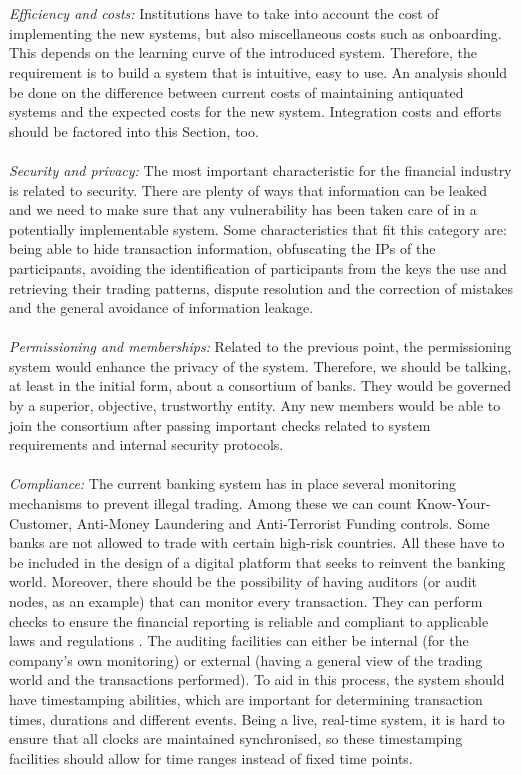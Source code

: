 \documentclass[12pt,twoside]{article}
\begin{document}
\\ \\
\textit{Efficiency and costs:} Institutions have to take into account the cost of implementing the new systems, but also miscellaneous costs such as onboarding. This depends on the learning curve of the introduced system. Therefore, the requirement is to build a system that is intuitive, easy to use. An analysis should be done on the difference between current costs of maintaining antiquated systems and the expected costs for the new system. Integration costs and efforts should be factored into this Section, too.
\\ \\
\textit{Security and privacy:} The most important characteristic for the financial industry is related to security. There are plenty of ways that information can be leaked and we need to make sure that any vulnerability has been taken care of in a potentially implementable system. Some characteristics that fit this category are: being able to hide transaction information, obfuscating the IPs of the participants, avoiding the identification of participants from the keys the use and retrieving their trading patterns, dispute resolution and the correction of mistakes and the general avoidance of information leakage. 
\\ \\
\textit{Permissioning and memberships:} Related to the previous point, the permissioning system would enhance the privacy of the system. Therefore, we should be talking, at least in the initial form, about a consortium of banks. They would be governed by a superior, objective, trustworthy entity. Any new members would be able to join the consortium after passing important checks related to system requirements and internal security protocols.
\\ \\
\textit{Compliance:} The current banking system has in place several monitoring mechanisms to prevent illegal trading. Among these we can count Know-Your-Customer, Anti-Money Laundering and Anti-Terrorist Funding controls. Some banks are not allowed to trade with certain high-risk countries. All these have to be included in the design of a digital platform that seeks to reinvent the banking world. Moreover, there should be the possibility of having auditors (or audit nodes, as an example) that can monitor every transaction. They can perform checks to ensure the financial reporting is reliable and compliant to applicable laws and regulations \cite{GS:Audit}. The auditing facilities can either be internal (for the company's own monitoring) or external (having a general view of the trading world and the transactions performed). To aid in this process, the system should have timestamping abilities, which are important for determining transaction times, durations and different events. Being a live, real-time system, it is hard to ensure that all clocks are maintained synchronised, so these timestamping facilities should allow for time ranges instead of fixed time points. 
\end{document}
